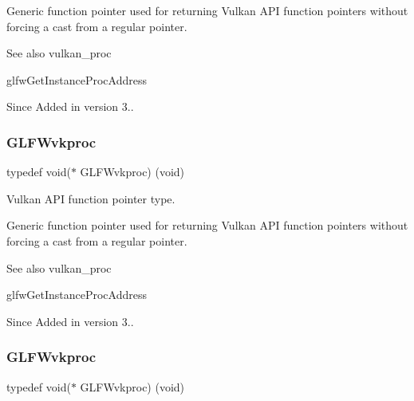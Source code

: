 Generic function pointer used for returning Vulkan A\+PI function pointers without forcing a cast from a regular pointer.

\begin{DoxySeeAlso}{See also}
vulkan\+\_\+proc 

glfw\+Get\+Instance\+Proc\+Address
\end{DoxySeeAlso}
\begin{DoxySince}{Since}
Added in version 3.. 
\end{DoxySince}
\mbox{\label{group__vulkan_ga70c01918dc9d233a4fbe0681a43018af}} 
\subsubsection{\texorpdfstring{G\+L\+F\+Wvkproc}{GLFWvkproc}\hspace{0.1cm}{\footnotesize\ttfamily [2/5]}}
{\footnotesize\ttfamily typedef void($\ast$ G\+L\+F\+Wvkproc) (void)}



Vulkan A\+PI function pointer type. 

Generic function pointer used for returning Vulkan A\+PI function pointers without forcing a cast from a regular pointer.

\begin{DoxySeeAlso}{See also}
vulkan\+\_\+proc 

glfw\+Get\+Instance\+Proc\+Address
\end{DoxySeeAlso}
\begin{DoxySince}{Since}
Added in version 3.. 
\end{DoxySince}
\mbox{\label{group__vulkan_ga70c01918dc9d233a4fbe0681a43018af}} 
\subsubsection{\texorpdfstring{G\+L\+F\+Wvkproc}{GLFWvkproc}\hspace{0.1cm}{\footnotesize\ttfamily [3/5]}}
{\footnotesize\ttfamily typedef void($\ast$ G\+L\+F\+Wvkproc) (void)}



